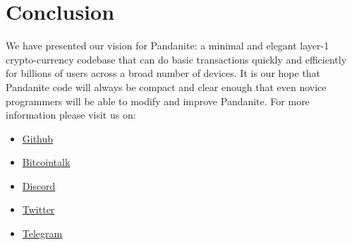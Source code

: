 \documentclass[11pt, a4paper]{elegantpaper}
\begin{document}
\section{Conclusion}
We have presented our vision for Pandanite: a minimal and elegant layer-1 crypto-currency codebase
that can do basic transactions quickly and efficiently for billions of users across a broad number
of devices. It is our hope that Pandanite code will always be compact and clear enough that even
novice programmers will be able to modify and improve Pandanite. For more information please
visit us on:
\begin{itemize}
\item \href{https://github.com/pandanite-crypto}{Github}
\item \href{https://bitcointalk.org/index.php?topic=5428374.0}{Bitcointalk}
\item \href{https://discord.com/invite/crfkWjxYyT}{Discord}
\item \href{https://twitter.com/pdn_pandanite}{Twitter}
\item \href{https://t.me/pandanite}{Telegram}

\end{itemize}
\end{document}
